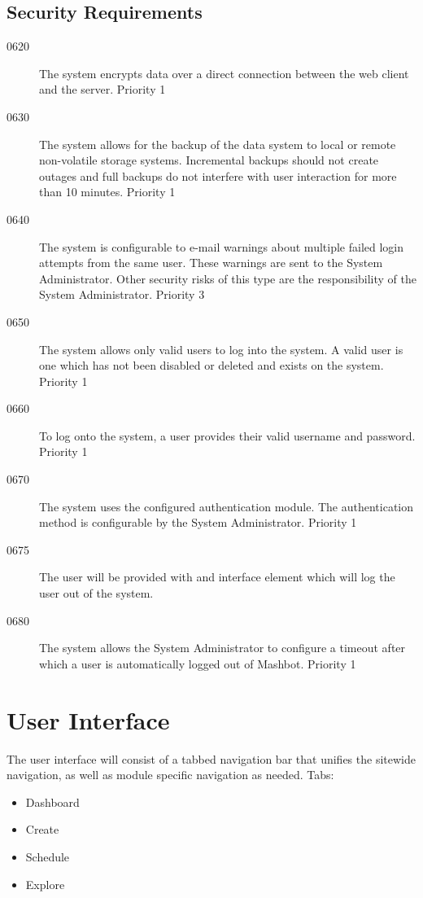 \documentclass{article}
\begin{document}
\begin{description}
\subsection{Security Requirements} %
\begin{description}
\item[0620] The system encrypts data over a direct connection between the
  web client and the server.  Priority 1
\item[0630] The system allows for the backup of the data system to local or
  remote non-volatile storage systems.  Incremental backups should not
  create outages and full backups do not interfere with user
  interaction for more than 10 minutes. Priority 1
\item[0640] The system is configurable to e-mail warnings about multiple
  failed login attempts from the same user. These warnings are sent to
  the System Administrator. Other security risks of this type are the
  responsibility of the System Administrator. Priority 3
\item[0650] The system allows only valid users to log into the system. A
  valid user is one which has not been disabled or deleted and exists
  on the system. Priority 1
\item[0660] To log onto the system, a user provides their valid username and
  password. Priority 1
\item[0670] The system uses the configured authentication module. The
  authentication method is configurable by the System
  Administrator. Priority 1
\item[0675] The user will be provided with and interface element which
  will log the user out of the system.
\item[0680] The system allows the System Administrator to configure a
  timeout after which a user is automatically logged out of
  Mashbot. Priority 1
\end{description}

\section{User Interface} %
The user interface will consist of a tabbed navigation bar that
unifies the sitewide navigation, as well as module specific navigation
as needed. Tabs:
\begin{itemize}
\item Dashboard
\item Create
\item Schedule
\item Explore
\end{itemize}

\end{description}
\end{document}
